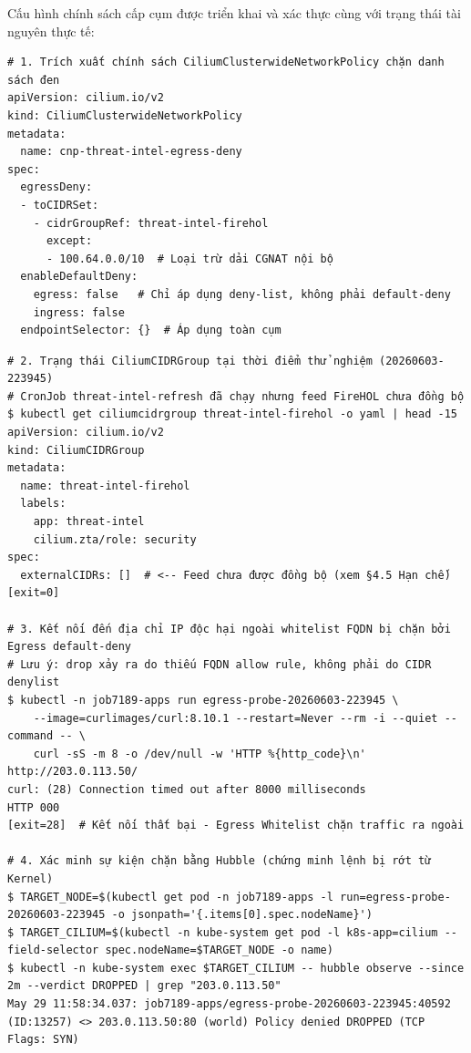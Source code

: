 Cấu hình chính sách cấp cụm được triển khai và xác thực cùng với trạng thái tài nguyên thực tế:

\begin{listing}[H]
\begin{verbatim}
# 1. Trích xuất chính sách CiliumClusterwideNetworkPolicy chặn danh sách đen
apiVersion: cilium.io/v2
kind: CiliumClusterwideNetworkPolicy
metadata:
  name: cnp-threat-intel-egress-deny
spec:
  egressDeny:
  - toCIDRSet:
    - cidrGroupRef: threat-intel-firehol
      except:
      - 100.64.0.0/10  # Loại trừ dải CGNAT nội bộ
  enableDefaultDeny:
    egress: false   # Chỉ áp dụng deny-list, không phải default-deny
    ingress: false
  endpointSelector: {}  # Áp dụng toàn cụm
\end{verbatim}
\caption{Định nghĩa chính sách chặn toàn cụm theo CIDR Group (trích xuất thực tế)}
\label{lst:kb6_ccnp_yaml}
\end{listing}

\begin{listing}[H]
\begin{verbatim}
# 2. Trạng thái CiliumCIDRGroup tại thời điểm thử nghiệm (20260603-223945)
# CronJob threat-intel-refresh đã chạy nhưng feed FireHOL chưa đồng bộ
$ kubectl get ciliumcidrgroup threat-intel-firehol -o yaml | head -15
apiVersion: cilium.io/v2
kind: CiliumCIDRGroup
metadata:
  name: threat-intel-firehol
  labels:
    app: threat-intel
    cilium.zta/role: security
spec:
  externalCIDRs: []  # <-- Feed chưa được đồng bộ (xem §4.5 Hạn chế)
[exit=0]

# 3. Kết nối đến địa chỉ IP độc hại ngoài whitelist FQDN bị chặn bởi Egress default-deny
# Lưu ý: drop xảy ra do thiếu FQDN allow rule, không phải do CIDR denylist
$ kubectl -n job7189-apps run egress-probe-20260603-223945 \
    --image=curlimages/curl:8.10.1 --restart=Never --rm -i --quiet --command -- \
    curl -sS -m 8 -o /dev/null -w 'HTTP %{http_code}\n' http://203.0.113.50/
curl: (28) Connection timed out after 8000 milliseconds
HTTP 000
[exit=28]  # Kết nối thất bại - Egress Whitelist chặn traffic ra ngoài

# 4. Xác minh sự kiện chặn bằng Hubble (chứng minh lệnh bị rớt từ Kernel)
$ TARGET_NODE=$(kubectl get pod -n job7189-apps -l run=egress-probe-20260603-223945 -o jsonpath='{.items[0].spec.nodeName}')
$ TARGET_CILIUM=$(kubectl -n kube-system get pod -l k8s-app=cilium --field-selector spec.nodeName=$TARGET_NODE -o name)
$ kubectl -n kube-system exec $TARGET_CILIUM -- hubble observe --since 2m --verdict DROPPED | grep "203.0.113.50"
May 29 11:58:34.037: job7189-apps/egress-probe-20260603-223945:40592 (ID:13257) <> 203.0.113.50:80 (world) Policy denied DROPPED (TCP Flags: SYN)
\end{verbatim}
\caption{Trạng thái CIDRGroup và minh chứng kết nối Egress bị chặn ở mức độ Kernel (Hubble logs)}
\label{lst:kb6_cidr_cmd}
\end{listing}


